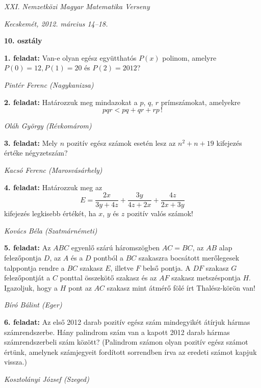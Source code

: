\documentclass[a4paper,10pt]{article}
\newcommand{\ki}[2]{\hfill {\it #1 (#2)}\medskip}
\begin{document}
\begin{center} \Large {\em XXI. Nemzetközi Magyar Matematika Verseny} \end{center}
\begin{center} \large{\em Kecskemét, 2012. március 14--18.} \end{center}
\smallskip
\begin{center} \large{\bf 10. osztály} \end{center}
\bigskip 

{\bf 1. feladat: } Van-e olyan egész együtthatós $P(x)$ polinom, amelyre 
$P(0)=12, P(1)=20$ és $P(2)=2012$?

\ki{Pintér Ferenc}{Nagykanizsa}\medskip

{\bf 2. feladat: } Határozzuk meg mindazokat a $p$, $q$, $r$ prímszámokat, amelyekre
\[pqr < pq + qr + rp\, !\]

\ki{Oláh György}{Révkomárom}\medskip

{\bf 3. feladat: } Mely $n$ pozitív egész számok esetén lesz az $n^2+n+19$ kifejezés értéke négyzetszám?

\ki{Kacsó Ferenc}{Marosvásárhely}\medskip

{\bf 4. feladat: } Határozzuk meg az
\[E=\frac{2x}{3y+4z}+\frac{3y}{4z+2x}+\frac{4z}{2x+3y}\]
kifejezés legkisebb értékét, ha $x$, $y$ és $z$ pozitív valós számok!

\ki{Kovács Béla}{Szatmárnémeti}\medskip

{\bf 5. feladat: } Az $ABC$ egyenlő szárú háromszögben $AC = BC$, 
az $AB$ alap felezőpontja $D$, az $A$ és a $D$ pontból
a $BC$ szakaszra bocsátott merőlegesek talppontja rendre a $BC$ szakasz $E$, illetve $F$ belső pontja. A $DF$ szakasz $G$ felezőpontját a $C$ ponttal összekötő szakasz és az $AF$ szakasz metszéspontja $H$.
Igazoljuk, hogy a $H$ pont az $AC$ szakasz mint átmérő fölé írt Thalész-körön van!

\ki{Bíró Bálint}{Eger}\medskip

{\bf 6. feladat: } Az első 2012 darab pozitív egész szám mindegyikét átírjuk hármas számrendszerbe. Hány palindrom szám van a kapott 2012 darab hármas számrendszerbeli szám között? (Palindrom számon
olyan pozitív egész számot értünk, amelynek számjegyeit fordított sorrendben írva az eredeti
számot kapjuk vissza.)

\ki{Kosztolányi József}{Szeged}\medskip
\end{document}
